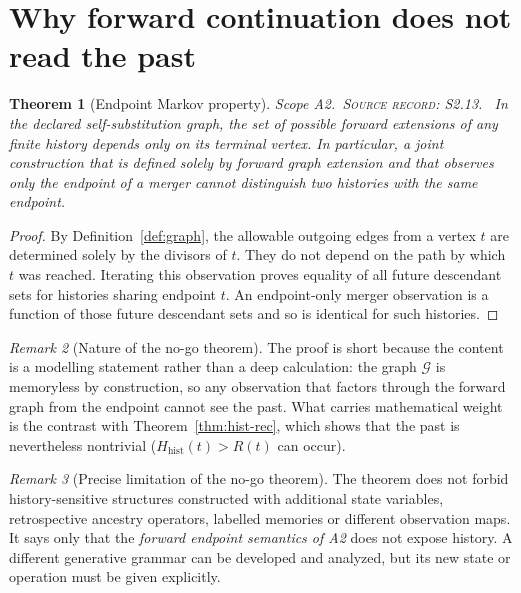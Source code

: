 \documentclass[11pt,oneside,openany]{book}
\newtheorem{theorem}{Theorem}[chapter]
\theoremstyle{definition}
\theoremstyle{remark}
\newtheorem{remark}[theorem]{Remark}
\newcommand{\scope}[1]{\textsf{\small Scope #1.}\ }
\newcommand{\record}[1]{\textup{\textsc{Source record: #1.}}\ }
\newcommand{\Gen}{\mathcal{G}}
\newcommand{\nohist}{H_{\mathrm{hist}}}
\begin{document}
\section{Why forward continuation does not read the past}
\begin{theorem}[Endpoint Markov property]\label{thm:markov}
\scope{A2}\record{S2.13} In the declared self-substitution graph, the set of possible forward extensions of any finite history depends only on its terminal vertex. In particular, a joint construction that is defined solely by forward graph extension and that observes only the endpoint of a merger cannot distinguish two histories with the same endpoint.
\end{theorem}
\begin{proof}
By Definition~\ref{def:graph}, the allowable outgoing edges from a vertex \(t\) are determined solely by the divisors of \(t\). They do not depend on the path by which \(t\) was reached. Iterating this observation proves equality of all future descendant sets for histories sharing endpoint \(t\). An endpoint-only merger observation is a function of those future descendant sets and so is identical for such histories.
\end{proof}

\begin{remark}[Nature of the no-go theorem]
The proof is short because the content is a modelling statement rather than a deep calculation: the graph \(\Gen\) is memoryless by construction, so any observation that factors through the forward graph from the endpoint cannot see the past. What carries mathematical weight is the contrast with Theorem~\ref{thm:hist-rec}, which shows that the past is nevertheless nontrivial (\(\nohist(t)>R(t)\) can occur).
\end{remark}

\begin{remark}[Precise limitation of the no-go theorem]
The theorem does not forbid history-sensitive structures constructed with additional state variables, retrospective ancestry operators, labelled memories or different observation maps. It says only that the \emph{forward endpoint semantics of A2} does not expose history. A different generative grammar can be developed and analyzed, but its new state or operation must be given explicitly.
\end{remark}
\end{document}
